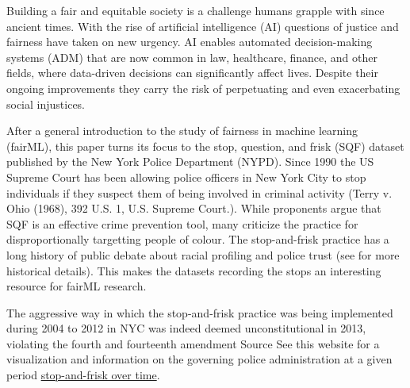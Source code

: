 
Building a fair and equitable society is a challenge humans grapple with since ancient times. With the rise of artificial intelligence (AI) questions of justice and fairness have taken on new urgency. AI enables automated decision-making systems (ADM) that are now common in law, healthcare, finance, and other fields, where data-driven decisions can significantly affect lives. Despite their ongoing improvements they carry the risk of perpetuating and even exacerbating social injustices. 



After a general introduction to the study of fairness in machine learning (fairML), this paper turns its focus to the stop, question, and frisk (SQF) dataset published by the New York Police Department (NYPD). Since 1990 the US Supreme Court has been allowing police officers in New York City to stop individuals if they suspect them of being involved in criminal activity (Terry v. Ohio (1968), 392 U.S. 1, U.S. Supreme Court.). While proponents argue that SQF is an effective crime prevention tool, many criticize the practice for disproportionally targetting people of colour. The stop-and-frisk practice has a long history of public debate about racial profiling and police trust (see \cite{gelman2007} for more historical details). This makes the datasets recording the stops an interesting resource for fairML research.

The aggressive way in which the stop-and-frisk practice was being implemented during 2004 to 2012 in NYC was indeed deemed unconstitutional in 2013, violating the fourth and fourteenth amendment {\color{red} Source}
See this website for a visualization and information on the governing police administration at a given period \href{https://www.nyclu.org/data/stop-and-frisk-data}{stop-and-frisk over time}.

